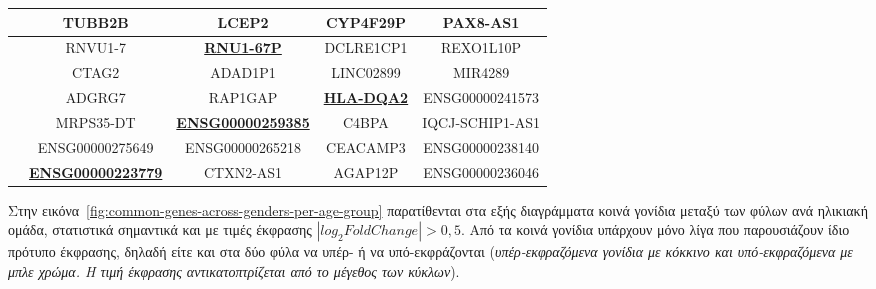 \documentclass[12pt]{report}
\begin{document}
\begin{table}[ht]
\begin{tabular}{@{}>{\raggedright}p{1.3cm}cccc@{}}
                        & \cellcolor{blue!20}TUBB2B & \cellcolor{red!20}LCEP2 & \cellcolor{blue!20}CYP4F29P & \cellcolor{blue!20}PAX8-AS1 \\
                        \midrule
                        \multirow{6}{*}{Γυναίκες}
                        & \cellcolor{red!20}RNVU1-7 & \cellcolor{blue!20}\textbf{\underline{RNU1-67P}} & \cellcolor{blue!20}DCLRE1CP1 & \cellcolor{red!20}REXO1L10P \\
                        & \cellcolor{red!20}CTAG2 & \cellcolor{red!20}ADAD1P1 & \cellcolor{blue!20}LINC02899 & \cellcolor{red!20}MIR4289 \\
                        & \cellcolor{red!20}ADGRG7 & \cellcolor{blue!20}RAP1GAP & \cellcolor{blue!20}\textbf{\underline{HLA-DQA2}} & \cellcolor{red!20}ENSG00000241573 \\
                        & \cellcolor{red!20}MRPS35-DT & \cellcolor{blue!20}\textbf{\underline{ENSG00000259385}} & \cellcolor{red!20}C4BPA & \cellcolor{red!20}IQCJ-SCHIP1-AS1 \\
                        & \cellcolor{red!20}ENSG00000275649 & \cellcolor{blue!20}ENSG00000265218 & \cellcolor{blue!20}CEACAMP3 & \cellcolor{red!20}ENSG00000238140 \\
                        & \cellcolor{red!20}\textbf{\underline{ENSG00000223779}} & \cellcolor{blue!20}CTXN2-AS1 & \cellcolor{blue!20}AGAP12P & \cellcolor{red!20}ENSG00000236046 \\
                        
                        \bottomrule
                    \end{tabular}
                    \label{tab:top-6-degs-strata}
                \end{table}
                \par
                    Στην εικόνα~\ref{fig:common-genes-across-genders-per-age-group} παρατίθενται στα εξής διαγράμματα κοινά γονίδια μεταξύ των φύλων ανά ηλικιακή ομάδα, στατιστικά σημαντικά και με τιμές έκφρασης $|log_2FoldChange| > 0,5$. Από τα κοινά γονίδια υπάρχουν μόνο λίγα που παρουσιάζουν ίδιο πρότυπο έκφρασης, δηλαδή είτε και στα δύο φύλα να υπέρ- ή να υπό-εκφράζονται (\emph{υπέρ-εκφραζόμενα γονίδια με κόκκινο και υπό-εκφραζόμενα με μπλε χρώμα. Η τιμή έκφρασης αντικατοπτρίζεται από το μέγεθος των κύκλων}).
\end{document}
